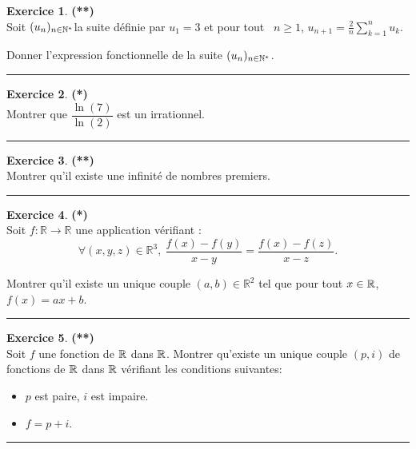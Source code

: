 \documentclass[a4paper,11pt]{article}
\theoremstyle{definition}
\newtheorem{exo}{Exercice} %
\begin{document}
\begin{exo}\textbf{(**)}\quad\\[0.2cm]
Soit $(u_n)_{n\in\mathbb{N}^*} $la suite définie par $u_1=3$ et pour tout \ $n\geq1$, $u_{n+1} = \frac{2}{n}\sum_{k=1}^{n}u_k$.

\noindent Donner l'expression fonctionnelle de la suite $(u_n)_{n\in\mathbb{N}^*}$. 


\centering
\rule{1\linewidth}{0.6pt}
\end{exo}	

\begin{exo}\textbf{(*)}\quad\\[0.2cm]
	Montrer que $\dfrac{\ln(7)}{\ln(2)}$ est un irrationnel. 
	
	\centering
	\rule{1\linewidth}{0.6pt}
\end{exo}

\begin{exo}\textbf{(**)}\quad\\[0.2cm]
Montrer qu'il existe une infinité de nombres premiers.

	\centering
	\rule{1\linewidth}{0.6pt}
\end{exo}		
		
	
\newpage

\begin{exo}\textbf{(*)}\quad\\[0.2cm]
	Soit $f : \mathbb{R} \longrightarrow \mathbb{R}$ une application vérifiant :
	$$ \forall (x,y,z) \in \mathbb{R}^{3},\  \dfrac{f(x)-f(y)}{x-y} = \dfrac{f(x)-f(z)}{x-z}.$$
	
	\noindent Montrer qu'il existe un unique couple $(a,b) \in \mathbb{R}^{2}$ tel que pour tout $x\in\mathbb{R}$, \ $f(x) = ax+b$.
	
	
	\centering
	\rule{1\linewidth}{0.6pt}
\end{exo}

\begin{exo} \textbf{(**)}\quad\\[0.2cm]
	Soit $f$ une fonction de $\mathbb{R}$ dans $\mathbb{R}$. Montrer qu'existe un unique couple $(p, i)$ de fonctions de $\mathbb{R}$ dans $\mathbb{R}$ vérifiant les conditions suivantes:
	\begin{itemize}
		\item $p$ est paire, $i$ est impaire.
		\item $f = p + i$.
	\end{itemize}
	
	\centering
	\rule{1\linewidth}{0.6pt}
\end{exo}
\end{document}
